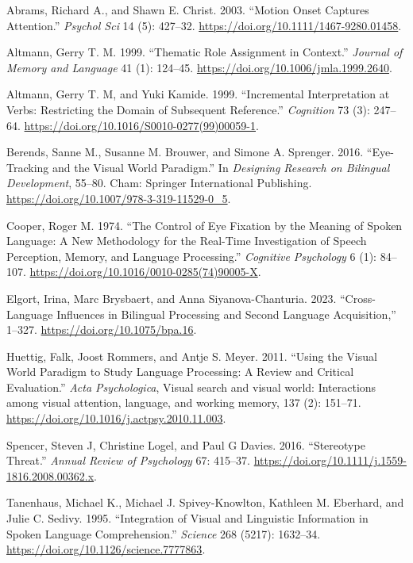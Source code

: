 \documentclass[
  12pt,
  letterpaper,
  DIV=11,
  numbers=noendperiod]{scrreprt}
\newlength{\cslhangindent}
\newenvironment{CSLReferences}[2] %
 {\begin{list}{}{%
  \setlength{\itemindent}{0pt}
  \setlength{\leftmargin}{0pt}
  \setlength{\parsep}{0pt}
  \ifodd #1
   \setlength{\leftmargin}{\cslhangindent}
   \setlength{\itemindent}{-1\cslhangindent}
  \fi
  \setlength{\itemsep}{#2\baselineskip}}}
 {\end{list}}
\begin{document}
\label{refs}
\begin{CSLReferences}{1}{0}
Abrams, Richard A., and Shawn E. Christ. 2003. {``Motion {Onset}
{Captures} {Attention}.''} \emph{Psychol Sci} 14 (5): 427--32.
\url{https://doi.org/10.1111/1467-9280.01458}.

Altmann, Gerry T. M. 1999. {``Thematic {Role} {Assignment} in
{Context}.''} \emph{Journal of Memory and Language} 41 (1): 124--45.
\url{https://doi.org/10.1006/jmla.1999.2640}.

Altmann, Gerry T. M, and Yuki Kamide. 1999. {``Incremental
Interpretation at Verbs: Restricting the Domain of Subsequent
Reference.''} \emph{Cognition} 73 (3): 247--64.
\url{https://doi.org/10.1016/S0010-0277(99)00059-1}.

Berends, Sanne M., Susanne M. Brouwer, and Simone A. Sprenger. 2016.
{``Eye-{Tracking} and the {Visual} {World} {Paradigm}.''} In
\emph{Designing {Research} on {Bilingual} {Development}}, 55--80. Cham:
Springer International Publishing.
\url{https://doi.org/10.1007/978-3-319-11529-0_5}.

Cooper, Roger M. 1974. {``The Control of Eye Fixation by the Meaning of
Spoken Language: {A} New Methodology for the Real-Time Investigation of
Speech Perception, Memory, and Language Processing.''} \emph{Cognitive
Psychology} 6 (1): 84--107.
\url{https://doi.org/10.1016/0010-0285(74)90005-X}.

Elgort, Irina, Marc Brysbaert, and Anna Siyanova-Chanturia. 2023.
{``Cross-Language {Influences} in {Bilingual} {Processing} and {Second}
{Language} {Acquisition},''} 1--327.
\url{https://doi.org/10.1075/bpa.16}.

Huettig, Falk, Joost Rommers, and Antje S. Meyer. 2011. {``Using the
Visual World Paradigm to Study Language Processing: {A} Review and
Critical Evaluation.''} \emph{Acta Psychologica}, Visual search and
visual world: {Interactions} among visual attention, language, and
working memory, 137 (2): 151--71.
\url{https://doi.org/10.1016/j.actpsy.2010.11.003}.

Spencer, Steven J, Christine Logel, and Paul G Davies. 2016.
{``Stereotype Threat.''} \emph{Annual Review of Psychology} 67: 415--37.
\url{https://doi.org/10.1111/j.1559-1816.2008.00362.x}.

Tanenhaus, Michael K., Michael J. Spivey-Knowlton, Kathleen M. Eberhard,
and Julie C. Sedivy. 1995. {``Integration of {Visual} and {Linguistic}
{Information} in {Spoken} {Language} {Comprehension}.''} \emph{Science}
268 (5217): 1632--34. \url{https://doi.org/10.1126/science.7777863}.

\end{CSLReferences}
\end{document}
